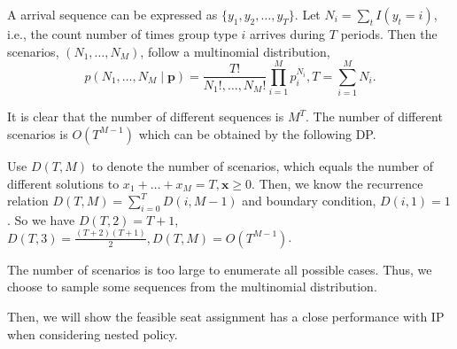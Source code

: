 A arrival sequence can be expressed as $\{y_{1}, y_{2}, \ldots, y_{T}\}$. Let $N_{i} = \sum_{t} I(y_t = i)$, i.e., the count number of times group type $i$ arrives during $T$ periods. Then the scenarios, $(N_1, \ldots, N_{M})$, follow a multinomial distribution, $$p\left(N_1, \ldots, N_{M} \mid \mathbf{p}\right)=\frac{T !}{N_{1}!, \ldots, N_{M}!} \prod_{i=1}^{M} p_{i}^{N_i}, T = \sum_{i=1}^{M} N_{i}.$$

It is clear that the number of different sequences is $M^{T}$. The number of different scenarios is $O(T^{M-1})$ which can be obtained by the following DP.

Use $D(T, M) $ to denote the number of scenarios, which equals the number of different solutions to $x_{1}+\ldots + x_{M} = T, \mathbf{x} \geq 0$. Then, we know the recurrence relation $D(T, M) = \sum_{i= 0}^{T} D(i, M-1)$ and boundary condition, $D(i,1) = 1$. So we have $D(T,2) = T+1$, $D(T,3) = \frac{(T+2)(T+1)}{2}, D(T,M) = O(T^{M-1})$. 

The number of scenarios is too large to enumerate all possible cases. Thus, we choose to sample some sequences from the multinomial distribution.

Then, we will show the feasible seat assignment has a close performance with IP when considering nested policy.


